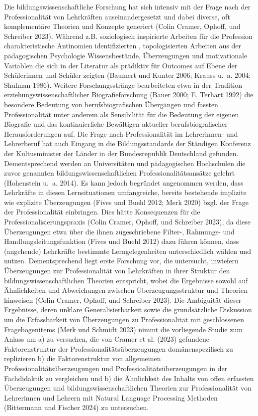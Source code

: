 \documentclass[
  letterpaper,
  DIV=11]{scrartcl}
\begin{document}
Die bildungswissenschaftliche Forschung hat sich intensiv mit der Frage
nach der Professionalität von Lehrkräften auseinandergesetzt und dabei
diverse, oft komplementäre Theorien und Konzepte generiert (Colin
Cramer, Ophoff, und Schreiber 2023). Während z.B. soziologisch
inspirierte Arbeiten für die Profession charakteristische Antinomien
identifizierten , topologisierten Arbeiten aus der pädagogischen
Psychologie Wissensbestände, Überzeugungen und motivationale Variablen
die sich in der Literatur als prädiktiv für Outcomes auf Ebene der
Schülerinnen und Schüler zeigten (Baumert und Kunter 2006; Krauss u.~a.
2004; Shulman 1986). Weitere Forschungsstränge bearbeiteten etwa in der
Tradition erziehungswissenschaftlicher Biografieforschung (Bauer 2000;
E. Terhart 1992) die besondere Bedeutung von berufsbiografischen
Übergängen und fassten Professionalität unter anderem als Sensibilität
für die Bedeutung der eigenen Biografie und das kontinuierliche
Bewältigen aktueller berufsbiografischer Herausforderungen auf. Die
Frage nach Professionalität im Lehrerinnen- und Lehrerberuf hat auch
Eingang in die Bildungsstandards der Ständigen Konferenz der
Kultusminister der Länder in der Bundesrepublik Deutschland gefunden.
Dementsprechend werden an Universitäten und pädagogischen Hochschulen
die zuvor genannten bildungswissenschaftlichen Professionalitätsansätze
gelehrt (Hohenstein u.~a. 2014). Es kann jedoch begründet angenommen
werden, dass Lehrkräfte in diesen Lernsituationen umfangreiche, bereits
bestehende implizite wie explizite Überzeugungen (Fives und Buehl 2012;
Merk 2020) bzgl. der Frage der Professionalität einbringen. Dies hätte
Konsequenzen für die Professionalisierungspraxis (Colin Cramer, Ophoff,
und Schreiber 2023), da diese Überzeugungen etwa über die ihnen
zugeschriebene Filter-, Rahmungs- und Handlungsleitungsfunktion (Fives
und Buehl 2012) dazu führen können, dass (angehende) Lehrkräfte
bestimmte Lerngelegenheiten unterschiedlich wählen und nutzen.
Dementsprechend liegt erste Forschung vor, die untersucht, inwiefern
Überzeugungen zur Professionalität von Lehrkräften in ihrer Struktur den
bildungswissenschaftlichen Theorien entspricht, wobei die Ergebnisse
sowohl auf Ähnlichkeiten und Abweichungen zwischen Überzeugungsstruktur
und Theorien hinweisen (Colin Cramer, Ophoff, und Schreiber 2023). Die
Ambiguität dieser Ergebnisse, deren unklare Generalisierbarkeit sowie
die grundsätzliche Diskussion um die Erfassbarkeit von Überzeugungen zu
Professionalität mit geschlossenen Fragebogenitems (Merk und Schmidt
2023) nimmt die vorliegende Studie zum Anlass um a) zu versuchen, die
von Cramer et al. (2023) gefundene Faktorenstruktur der
Professionalitätsüberzeugungen domänenspezifisch zu replizieren b) die
Faktorenstruktur von allgemeinen Professionalitätsüberzeugungen und
Professioalitätsüberzeugungen in der Fachdidaktik zu vergleichen und b)
die Ähnlichkeit des Inhalts von offen erfassten Überzeugungen und
bildungswissenschaftlichen Theorien zur Professionalität von Lehrerinnen
und Lehrern mit Natural Language Processing Methoden (Bittermann und
Fischer 2024) zu untersuchen.
\end{document}
